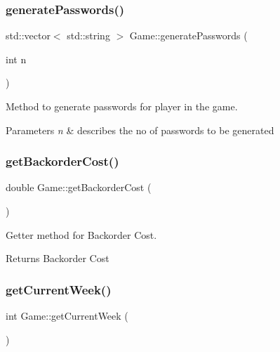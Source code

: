 \subsubsection{\texorpdfstring{generate\+Passwords()}{generatePasswords()}}
{\footnotesize\ttfamily std\+::vector$<$ std\+::string $>$ Game\+::generate\+Passwords (\begin{DoxyParamCaption}\item[{int}]{n }\end{DoxyParamCaption})}



Method to generate passwords for player in the game. 


\begin{DoxyParams}{Parameters}
{\em n} & describes the no of passwords to be generated \\
\hline
\end{DoxyParams}
\mbox{\label{class_game_ab29ec1e3f5dd71e0f67b3bda884ff166}} 
\subsubsection{\texorpdfstring{get\+Backorder\+Cost()}{getBackorderCost()}}
{\footnotesize\ttfamily double Game\+::get\+Backorder\+Cost (\begin{DoxyParamCaption}{ }\end{DoxyParamCaption})}



Getter method for Backorder Cost. 

\begin{DoxyReturn}{Returns}
Backorder Cost 
\end{DoxyReturn}
\mbox{\label{class_game_aa131c51d4b09434ec8986048483ef17e}} 
\subsubsection{\texorpdfstring{get\+Current\+Week()}{getCurrentWeek()}}
{\footnotesize\ttfamily int Game\+::get\+Current\+Week (\begin{DoxyParamCaption}{ }\end{DoxyParamCaption})}



